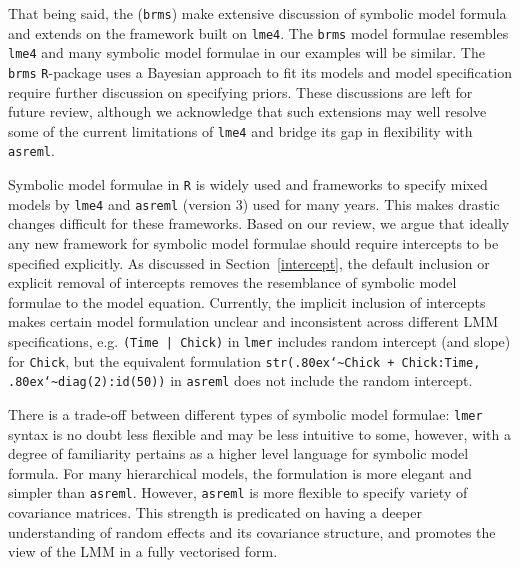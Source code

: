\documentclass[runningheads]{llncs}\usepackage[]{graphicx}\usepackage[]{color}
\newcommand{\mytilde}{\lower.80ex\hbox{\char`\~}}
\begin{document}
That being said, the \citet{brmsjss, brmsr} (\texttt{brms}) make extensive discussion of symbolic model formula and extends on the framework built on \texttt{lme4}. The \texttt{brms} model formulae resembles  \texttt{lme4} and many symbolic model formulae in our examples will be similar. The \texttt{brms} \texttt{R}-package uses a Bayesian approach to fit its models and model specification require further discussion on specifying priors. These discussions are left for future review, although we acknowledge that such extensions may well resolve some of the current limitations of \texttt{lme4} and bridge its gap in flexibility with \texttt{asreml}.

Symbolic model formulae in \texttt{R} is widely used and frameworks to specify mixed models by \texttt{lme4} and \texttt{asreml} (version 3) used for many years. This makes drastic changes difficult for these frameworks. Based on our review, we argue that ideally any new framework for symbolic model formulae should require intercepts to be specified explicitly. As discussed in Section~\ref{intercept}, the default inclusion or explicit removal of intercepts removes the resemblance of symbolic model formulae to the model equation. Currently, the implicit inclusion of intercepts makes certain model formulation unclear and inconsistent across different LMM specifications, e.g. \texttt{(Time | Chick)} in \texttt{lmer} includes random intercept (and slope) for \texttt{Chick}, but the equivalent formulation \texttt{str(\mytilde Chick + Chick:Time, \mytilde diag(2):id(50))} in \texttt{asreml} does not include the random intercept.

There is a trade-off between different types of symbolic model formulae: \texttt{lmer} syntax is no doubt less flexible and may be less intuitive to some, however, with a degree of familiarity pertains as a higher level language for symbolic model formula. For many hierarchical models, the formulation is more elegant and simpler than \texttt{asreml}. However, \texttt{asreml} is more flexible to specify variety of covariance matrices. This strength is predicated on having a deeper understanding of random effects and its covariance structure, and promotes the view of the LMM in a fully vectorised form. 

\end{document}
